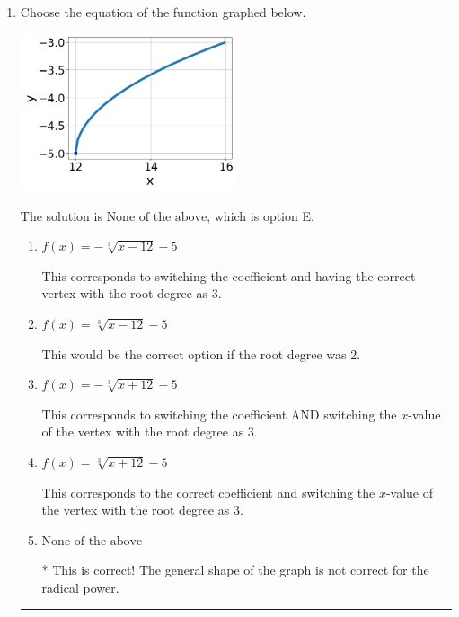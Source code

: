 \documentclass{extbook}[14pt]
\newcommand{\litem}[1]{\item #1

\rule{\textwidth}{0.4pt}}
\begin{document}
\begin{enumerate}\litem{
Choose the equation of the function graphed below.

\begin{center}
    \includegraphics[width=0.5\textwidth]{../Figures/radicalGraphToEquationC.png}
\end{center}


The solution is \( \text{None of the above} \), which is option E.\begin{enumerate}[label=\Alph*.]
\item \( f(x) = - \sqrt[3]{x - 12} - 5 \)

This corresponds to switching the coefficient and having the correct vertex with the root degree as $3$.
\item \( f(x) = \sqrt[3]{x - 12} - 5 \)

This would be the correct option if the root degree was $2$.
\item \( f(x) = - \sqrt[3]{x + 12} - 5 \)

This corresponds to switching the coefficient AND switching the $x$-value of the vertex with the root degree as $3$.
\item \( f(x) = \sqrt[3]{x + 12} - 5 \)

This corresponds to the correct coefficient and switching the $x$-value of the vertex with the root degree as $3$.
\item \( \text{None of the above} \)

* This is correct! The general shape of the graph is not correct for the radical power.
\end{enumerate}

}
\end{enumerate}
\end{document}
